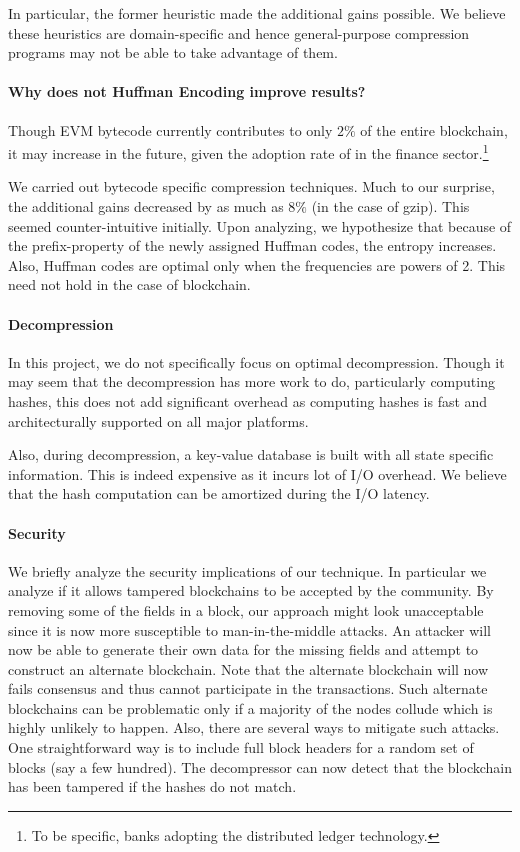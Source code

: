 In particular, the former heuristic made the additional gains possible. 
We believe these heuristics are domain-specific and hence general-purpose
compression programs may not be able to take advantage of them.

\paragraph{Why does not Huffman Encoding improve results?}
Though EVM bytecode currently contributes to only $2\%$ of the entire blockchain, it may increase in the future, given the adoption rate of \eth{}  in the finance sector.\footnote{To be specific, banks adopting the distributed ledger technology.} 

We carried out bytecode specific compression techniques. Much to our surprise, the additional gains decreased by as much as $8\%$ (in the case of gzip).
This seemed counter-intuitive initially. Upon analyzing, we hypothesize that
because of the prefix-property of the newly assigned Huffman codes, the entropy increases.
Also, Huffman codes are optimal only when the frequencies are powers of 2. This need not hold in the case of blockchain.


\paragraph{Decompression}
In this project, we do not specifically focus on optimal decompression. 
Though it may seem that the decompression has more work to do, particularly computing hashes, this does not add significant overhead as computing hashes is fast and architecturally supported on all major platforms.

Also, during decompression, a key-value database is built with all state specific information. This is indeed expensive as it incurs lot of I/O overhead.
We believe that the hash computation can be amortized during the I/O latency.



\paragraph{Security}

We briefly analyze the security implications of our technique. 
In particular we analyze if it allows tampered blockchains to be accepted
by the community.
By removing some of the fields in a block,
our approach might look unacceptable since
it is now more susceptible to man-in-the-middle attacks. 
An attacker will now be able to generate their own data for the missing fields and attempt to construct an alternate blockchain.
Note that the alternate blockchain will now fails consensus and
thus cannot participate in the \eth{} transactions. 
Such alternate blockchains can be problematic 
only if a majority of the nodes collude which is highly unlikely to happen. 
Also, there are several ways to mitigate such attacks.
One straightforward way is to include full block headers for a random set of blocks (say a few hundred). The decompressor can now detect that the blockchain has been
tampered if the hashes do not match.
